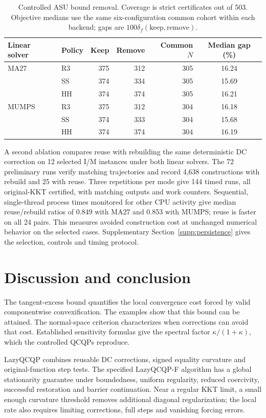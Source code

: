\documentclass[pdflatex,sn-mathphys-num]{sn-jnl}
\theoremstyle{thmstyleone}
\theoremstyle{thmstylethree}
\newcounter{algorithm}
\begin{document}
\begin{table}[t]
\centering\small
\caption{Controlled ASU bound removal. Coverage is strict certificates out
of 503. Objective medians use the same six-configuration common cohort
within each backend; gaps are $100\delta_f(\mathrm{keep},\mathrm{remove})$.}
\label{tab:asu-bounds-controlled}
\begin{tabular}{@{}llrrrc@{}}
\toprule
Linear solver & Policy & Keep & Remove & Common $N$ & Median gap (\%)\\
\midrule
MA27 & R3 & 375 & 312 & 305 & 16.24\\
     & SS & 374 & 334 & 305 & 15.69\\
     & HH & 374 & 374 & 305 & 16.21\\
\addlinespace
MUMPS & R3 & 375 & 312 & 304 & 16.18\\
      & SS & 374 & 333 & 304 & 15.68\\
      & HH & 374 & 374 & 304 & 16.19\\
\bottomrule
\end{tabular}
\end{table}

A second ablation compares reuse with rebuilding the same deterministic
DC correction on 12 selected I/M instances under both linear solvers.
The 72 preliminary runs verify matching trajectories and record 4,638
constructions with rebuild and 25 with reuse. Three repetitions per mode
give 144 timed runs, all original-KKT certified, with matching outputs
and work counters.
Sequential, single-thread process times monitored for other CPU activity
give median reuse/rebuild ratios of 0.849 with MA27 and 0.853 with MUMPS;
reuse is faster on all 24 pairs. This measures avoided
construction cost at unchanged numerical behavior on the selected cases.
Supplementary Section~\ref{supp:persistence} gives the selection, controls
and timing protocol.
\FloatBarrier
\section{Discussion and conclusion}
The tangent-excess bound quantifies the local convergence cost forced
by valid componentwise convexification. The examples show that this bound
can be attained. The normal-space criterion
characterizes when corrections can avoid that cost. Established
sensitivity formulas give the spectral factor $\kappa/(1+\kappa)$, which
the controlled QCQPs reproduce.

LazyQCQP combines reusable DC corrections, signed equality curvature and
original-function step tests. The specified LazyQCQP-F algorithm has a
global stationarity guarantee under boundedness, uniform regularity,
reduced coercivity, successful restoration and barrier continuation.
Near a regular KKT limit, a small enough
curvature threshold removes additional diagonal regularization; the local
rate also requires limiting corrections, full steps and vanishing forcing
errors.
\end{document}
